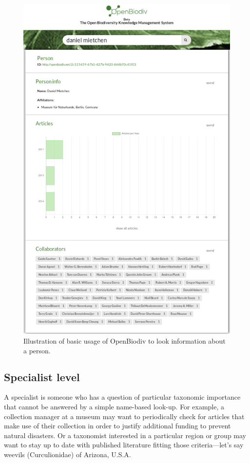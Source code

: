\begin{figure}
\centering
\includegraphics[width=\textwidth]{Figures/basic-level.png}
\decoRule
\caption{Illustration of basic usage of OpenBiodiv to look information about a person.}
\label{fig:basic-level}
\end{figure}

\subsection{Specialist level}

A specialist is someone who has a question of particular taxonomic importance that cannot be answered by a simple name-based look-up. For example, a collection manager at a museum may want to periodically check for articles that make use of their collection in order to justify additional funding to prevent natural disasters. Or a taxonomist interested in a particular region or group may want to stay up to date with published literature fitting those criteria---let's say weevils (Curculionidae) of Arizona, U.S.A. 

